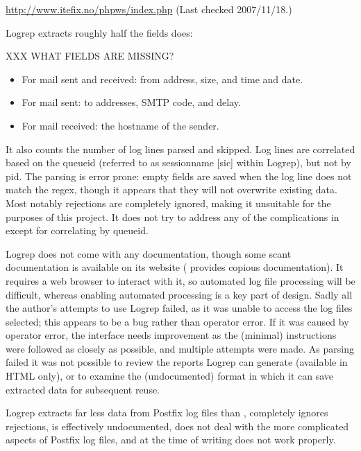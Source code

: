 \noindent{}\url{http://www.itefix.no/phpws/index.php} \newline{}
(Last checked 2007/11/18.)

Logrep extracts roughly half the fields \parsername{} does:

XXX WHAT FIELDS ARE MISSING\@?

\begin{itemize}

    \item For mail sent and received: from address, size, and time and
        date.

    \item For mail sent: to addresses, \gls{SMTP} code, and delay.

    \item For mail received: the hostname of the sender.

\end{itemize}

It also counts the number of log lines parsed and skipped.  Log lines are
correlated based on the queueid (referred to as sessionname [sic] within
Logrep), but not by \gls{pid}.  The parsing is error prone: empty fields
are saved when the log line does not match the regex, though it appears
that they will not overwrite existing data.  Most notably rejections are
completely ignored, making it unsuitable for the purposes of this project.
It does not try to address any of the complications in
 except for correlating by queueid.

Logrep does not come with any documentation, though some scant
documentation is available on its website (\parsername{} provides copious
documentation).  It requires a web browser to interact with it, so
automated log file processing will be difficult, whereas enabling automated
processing is a key part of \parsernames{} design.  Sadly all the author's
attempts to use Logrep failed, as it was unable to access the log files
selected; this appears to be a bug rather than operator error.  If it was
caused by operator error, the interface needs improvement as the (minimal)
instructions were followed as closely as possible, and multiple attempts
were made.  As parsing failed it was not possible to review the reports
Logrep can generate (available in HTML only), or to examine the
(undocumented) format in which it can save extracted data for subsequent
reuse.

Logrep extracts far less data from Postfix log files than \parsername{},
completely ignores rejections, is effectively undocumented, does not deal
with the more complicated aspects of Postfix log files, and at the time of
writing does not work properly.

